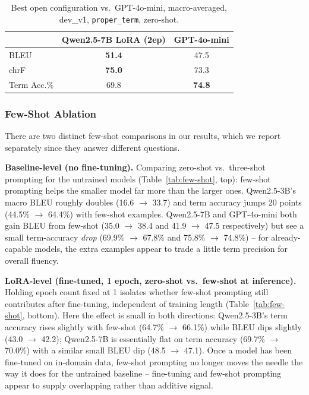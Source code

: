 \documentclass[11pt]{article}
\begin{document}
\begin{table}[t]
  \centering
  \small
  \begin{tabular}{lcc}
    \hline
    & \textbf{Qwen2.5-7B LoRA (2ep)} & \textbf{GPT-4o-mini} \\
    \hline
    BLEU & \textbf{51.4} & 47.5 \\
    chrF & \textbf{75.0} & 73.3 \\
    Term Acc.\% & 69.8 & \textbf{74.8} \\
    \hline
  \end{tabular}
  \caption{Best open configuration vs.\ GPT-4o-mini, macro-averaged, dev\_v1, \texttt{proper\_term}, zero-shot.}
  \label{tab:best-vs-gpt}
\end{table}

\subsubsection{Few-Shot Ablation}
\label{sec:exp-few-shot}

There are two distinct few-shot comparisons in our results, which we report separately since they answer different questions.

\textbf{Baseline-level (no fine-tuning).} Comparing zero-shot vs.\ three-shot prompting for the untrained models (Table~\ref{tab:few-shot}, top): few-shot prompting helps the smaller model far more than the larger ones. Qwen2.5-3B's macro BLEU roughly doubles (16.6 $\to$ 33.7) and term accuracy jumps 20 points (44.5\% $\to$ 64.4\%) with few-shot examples. Qwen2.5-7B and GPT-4o-mini both gain BLEU from few-shot (35.0 $\to$ 38.4 and 41.9 $\to$ 47.5 respectively) but see a small term-accuracy \emph{drop} (69.9\% $\to$ 67.8\% and 75.8\% $\to$ 74.8\%) -- for already-capable models, the extra examples appear to trade a little term precision for overall fluency.

\textbf{LoRA-level (fine-tuned, 1 epoch, zero-shot vs.\ few-shot at inference).} Holding epoch count fixed at 1 isolates whether few-shot prompting still contributes after fine-tuning, independent of training length (Table~\ref{tab:few-shot}, bottom). Here the effect is small in both directions: Qwen2.5-3B's term accuracy rises slightly with few-shot (64.7\% $\to$ 66.1\%) while BLEU dips slightly (43.0 $\to$ 42.2); Qwen2.5-7B is essentially flat on term accuracy (69.7\% $\to$ 70.0\%) with a similar small BLEU dip (48.5 $\to$ 47.1). Once a model has been fine-tuned on in-domain data, few-shot prompting no longer moves the needle the way it does for the untrained baseline -- fine-tuning and few-shot prompting appear to supply overlapping rather than additive signal.
\end{document}
